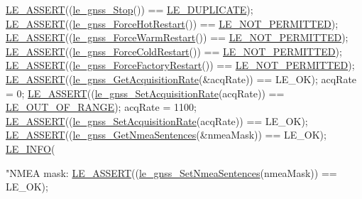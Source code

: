 \begin{DoxyCodeInclude}
{    \hyperlink{le__log_8h_ac0dbbef91dc0fed449d0092ff0557b39}{LE\_ASSERT}((\hyperlink{le__gnss__interface_8h_a93d63fdc76dbced071956b87de2abff7}{le\_gnss\_Stop}()) == \hyperlink{le__basics_8h_a1cca095ed6ebab24b57a636382a6c86cac26034778a666ee720b110c2fb1647ea}{LE\_DUPLICATE});
    \hyperlink{le__log_8h_ac0dbbef91dc0fed449d0092ff0557b39}{LE\_ASSERT}((\hyperlink{le__gnss__interface_8h_a29ff5b1e5bada1a9d15d19b3a0d2d4d1}{le\_gnss\_ForceHotRestart}()) == 
      \hyperlink{le__basics_8h_a1cca095ed6ebab24b57a636382a6c86cac6c0cac62213b786dabd7bf3e73bcec1}{LE\_NOT\_PERMITTED});
    \hyperlink{le__log_8h_ac0dbbef91dc0fed449d0092ff0557b39}{LE\_ASSERT}((\hyperlink{le__gnss__interface_8h_a1f5b3008db50d34c7962fb73c306f3d1}{le\_gnss\_ForceWarmRestart}()) == 
      \hyperlink{le__basics_8h_a1cca095ed6ebab24b57a636382a6c86cac6c0cac62213b786dabd7bf3e73bcec1}{LE\_NOT\_PERMITTED});
    \hyperlink{le__log_8h_ac0dbbef91dc0fed449d0092ff0557b39}{LE\_ASSERT}((\hyperlink{le__gnss__interface_8h_aa702703bbeebbefd65dd51b1f9fd4ce5}{le\_gnss\_ForceColdRestart}()) == 
      \hyperlink{le__basics_8h_a1cca095ed6ebab24b57a636382a6c86cac6c0cac62213b786dabd7bf3e73bcec1}{LE\_NOT\_PERMITTED});
    \hyperlink{le__log_8h_ac0dbbef91dc0fed449d0092ff0557b39}{LE\_ASSERT}((\hyperlink{le__gnss__interface_8h_a18219097f3e8c8e6e613462a5467f546}{le\_gnss\_ForceFactoryRestart}()) == 
      \hyperlink{le__basics_8h_a1cca095ed6ebab24b57a636382a6c86cac6c0cac62213b786dabd7bf3e73bcec1}{LE\_NOT\_PERMITTED});
    \hyperlink{le__log_8h_ac0dbbef91dc0fed449d0092ff0557b39}{LE\_ASSERT}((\hyperlink{le__gnss__interface_8h_acfa9b25ac13f601921bd9123a1d0daba}{le\_gnss\_GetAcquisitionRate}(&acqRate)) == LE\_OK);
    acqRate = 0;
    \hyperlink{le__log_8h_ac0dbbef91dc0fed449d0092ff0557b39}{LE\_ASSERT}((\hyperlink{le__gnss__interface_8h_a75d96ec7ac6e0d6b58525e4c523d3b2c}{le\_gnss\_SetAcquisitionRate}(acqRate)) == 
      \hyperlink{le__basics_8h_a1cca095ed6ebab24b57a636382a6c86caef8ecf11fa8556fd2d3ca8faab697717}{LE\_OUT\_OF\_RANGE});
    acqRate = 1100;
    \hyperlink{le__log_8h_ac0dbbef91dc0fed449d0092ff0557b39}{LE\_ASSERT}((\hyperlink{le__gnss__interface_8h_a75d96ec7ac6e0d6b58525e4c523d3b2c}{le\_gnss\_SetAcquisitionRate}(acqRate)) == LE\_OK);
    \hyperlink{le__log_8h_ac0dbbef91dc0fed449d0092ff0557b39}{LE\_ASSERT}((\hyperlink{le__gnss__interface_8h_a985845ac33d35c34ac3099b6557ca8ea}{le\_gnss\_GetNmeaSentences}(&nmeaMask)) == LE\_OK);
    \hyperlink{le__log_8h_a23e6d206faa64f612045d688cdde5808}{LE\_INFO}(\textcolor{stringliteral}{"NMEA mask: %
    \hyperlink{le__log_8h_ac0dbbef91dc0fed449d0092ff0557b39}{LE\_ASSERT}((\hyperlink{le__gnss__interface_8h_ab9253e29d74cae6e962dcc8b94f0e3c1}{le\_gnss\_SetNmeaSentences}(nmeaMask)) == LE\_OK);

}}
\end{DoxyCodeInclude}
